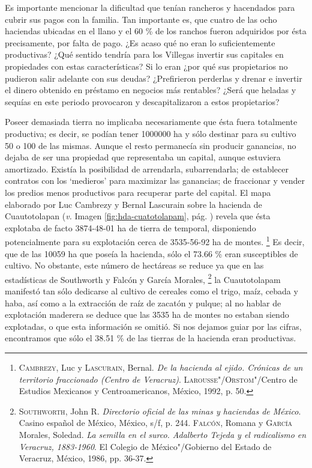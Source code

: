 \documentclass[14pt,twoside,final]{extbook} %
\let\oldfootnote\footnote
\renewcommand\footnote[1]{%
\oldfootnote{\hspace{1mm}#1}}
\begin{document}
Es importante mencionar la dificultad que tenían rancheros y hacendados para cubrir sus pagos con la familia. Tan importante es, que cuatro de las ocho haciendas ubicadas en el llano y el 60 \% de los ranchos fueron adquiridos por ésta precisamente, por falta de pago. ¿Es acaso qué no eran lo suficientemente productivas? ¿Qué sentido tendría para los Villegas invertir sus capitales en propiedades con estas características? Si lo eran ¿por qué sus propietarios no pudieron salir adelante con sus deudas? ¿Prefirieron perderlas y drenar e invertir el dinero obtenido en préstamo en negocios más rentables? ¿Será que heladas y sequías en este periodo provocaron y descapitalizaron a estos propietarios?

Poseer demasiada tierra no implicaba necesariamente que ésta fuera totalmente productiva; es decir, se podían tener 1000000 ha y sólo destinar para su cultivo 50 o 100 de las mismas. Aunque el resto permanecía sin producir ganancias, no dejaba de ser una propiedad que representaba un capital, aunque estuviera amortizado. Existía la posibilidad de arrendarla, subarrendarla; de establecer contratos con los `medieros' para maximizar las ganancias; de fraccionar y vender los predios menos productivos para recuperar parte del capital. El mapa elaborado por Luc Cambrezy y Bernal Lascurain sobre la hacienda de Cuautotolapan (\emph{v.} Imagen \ref{fig:hda-cuatotolapam}, pág. \pageref{fig:hda-cuatotolapam}) revela que ésta explotaba de facto 3874-48-01 ha de tierra de temporal, disponiendo potencialmente para su explotación cerca de 3535-56-92 ha de montes.\footnote{\textsc{Cambrezy}, Luc y \textsc{Lascurain}, Bernal. \emph{De la hacienda al ejido. Crónicas de un territorio fraccionado (Centro de Veracruz)}. \textsc{Larousse"/Orstom}"/Centro de Estudios Mexicanos y Centroamericanos, México, 1992, p. 50.} Es decir, que de las 10059 ha que poseía la hacienda, sólo el 73.66 \% eran susceptibles de cultivo. No obstante, este número de hectáreas se reduce ya que en las estadísticas de Southworth y Falcón y García Morales,\footnote{\textsc{Southworth}, John R. \emph{Directorio oficial de las minas y haciendas de México}. Casino español de México, México, s/f, p. 244. \textsc{Falcón}, Romana y \textsc{García} Morales, Soledad. \emph{La semilla en el surco. Adalberto Tejeda y el radicalismo en Veracruz, 1883-1960}. El Colegio de México"/Gobierno del Estado de Veracruz, México, 1986, pp. 36-37.} la Cuautotolapam manifestó tan sólo dedicarse al cultivo de cereales como el trigo, maíz, cebada y haba, así como a la extracción de raíz de zacatón y pulque; al no hablar de explotación maderera se deduce que las 3535 ha de montes no estaban siendo explotadas, o que esta información se omitió. Si nos dejamos guiar por las cifras, encontramos que sólo el 38.51 \% de las tierras de la hacienda eran productivas.
\end{document}
